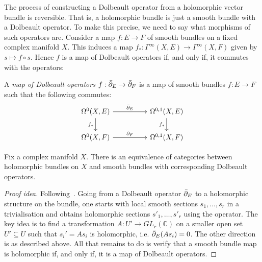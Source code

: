 \documentclass[12pt]{ociamthesis}  %
\begin{document}
The process of constructing a Dolbeault operator from a holomorphic
vector bundle is reversible. That is, a holomorphic
bundle is just a smooth bundle with a Dolbeault operator. To make
this precise, we need to say what morphisms of such operators are.
Consider a map $f : E \to F$ of smooth bundles on a fixed complex
manifold $X$. This induces a map
$f_*:\Gamma^\infty(X,E)\to\Gamma^\infty(X,F)$
given by $s \mapsto f\circ s$. Hence $f$ is a map of Dolbeault operators
if, and only if, it commutes with the operators:

\begin{definition}
  A \emph{map of Dolbeault operators} $f : {\bar{\partial}}_E \to {\bar{\partial}}_F$
  is a map of smooth bundles $f : E\to F$ such that the following commutes:
  \begin{equation*}
    \begin{tikzcd}
      {\Omega^0(X,E)} && {\Omega^{0,1}(X,E)} \\
      {\Omega^0(X,F)} && {\Omega^{0,1}(X,F)}
      \arrow["{\bar\partial_E}", from=1-1, to=1-3]
      \arrow["{f_*}"', from=1-1, to=2-1]
      \arrow["{f_*}"', from=1-3, to=2-3]
      \arrow["{\bar\partial_F}", from=2-1, to=2-3]
    \end{tikzcd}
  \end{equation*}
\end{definition}

\begin{theorem}
  Fix a complex manifold $X$. There is an equivalence of categories
  between holomorphic bundles on $X$ and smooth bundles with corresponding
  Dolbeault operators.
  \begin{proof}[Proof idea]
    Following~\cite[Theorem 9.2]{moroianu2004}. 
    Going from a Dolbeault operator ${\bar{\partial}}_E$ to a holomorphic structure
    on the bundle, one starts with local smooth sections
    $s_1,\ldots,s_r$ in a trivialisation and obtains holomorphic 
    sections $s'_1,\ldots,s'_r$ using the operator. The key idea is
    to find a transformation $A : U' \to GL_r(\mathbb C)$ on a smaller
    open set $U'\subseteq U$ such that $s_i' = As_i$ is holomorphic,
    i.e. ${\bar{\partial}}_E(As_i) = 0$. The other direction is as described
    above. All that remains to do is verify that a smooth bundle map
    is holomorphic if, and only if, it is a map of Dolbeault operators.
  \end{proof}
\end{theorem}
\end{document}
